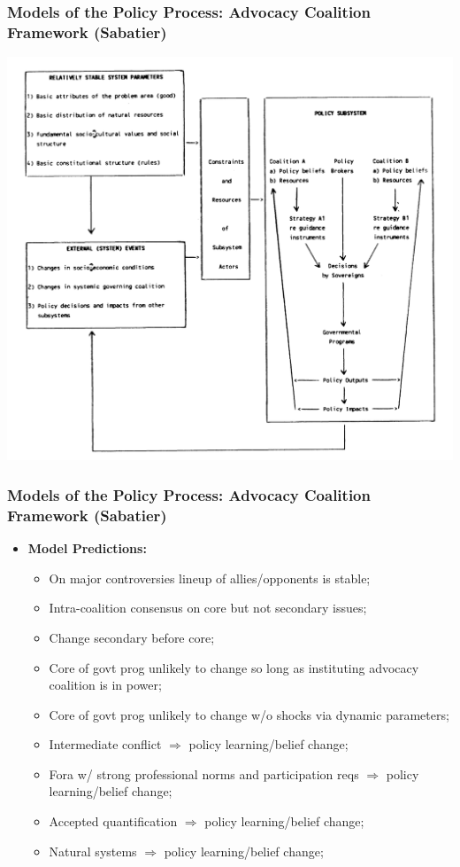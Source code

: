 \documentclass[aspectratio=169]{beamer}
\theoremstyle{principle}
\begin{document}
\begin{frame}
\frametitle{Models of the Policy Process: Advocacy Coalition Framework (Sabatier)}

    \begin{center}
     \includegraphics[scale=0.35]{ACF.png}
     \end{center}

\end{frame}

\begin{frame}
\frametitle{Models of the Policy Process: Advocacy Coalition Framework (Sabatier)}

\begin{itemize}
\item \textbf{Model Predictions:}
\begin{itemize}
\item On major controversies lineup of allies/opponents is stable;
\item Intra-coalition consensus on core but not secondary issues;
\item Change secondary before core;
\item Core of govt prog unlikely to change so long as instituting advocacy coalition is in power;
\item Core of govt prog unlikely to change w/o shocks via dynamic parameters;
\item Intermediate conflict $\Rightarrow$ policy learning/belief change;
\item Fora w/ strong professional norms and participation reqs $\Rightarrow$ policy learning/belief change;
\item Accepted quantification $\Rightarrow$ policy learning/belief change;
\item Natural systems $\Rightarrow$ policy learning/belief change;
\end{itemize}
\end{itemize}

\end{frame}

\end{document}

